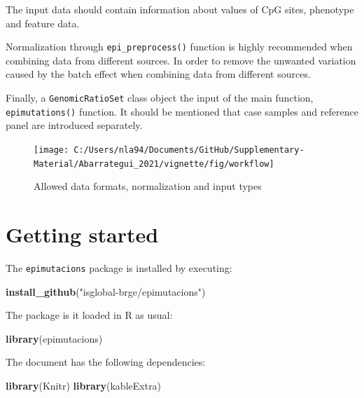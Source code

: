 \documentclass[
]{article}
\newenvironment{Shaded}{\begin{snugshade}}{\end{snugshade}}
\newcommand{\KeywordTok}[1]{\textcolor[rgb]{0.13,0.29,0.53}{\textbf{#1}}}
\newcommand{\NormalTok}[1]{#1}
\newcommand{\StringTok}[1]{\textcolor[rgb]{0.31,0.60,0.02}{#1}}
\begin{document}
The input data should contain information about \beta values of CpG
sites, phenotype and feature data.

Normalization through \texttt{epi\_preprocess()} function is highly
recommended when combining data from different sources. In order to
remove the unwanted variation caused by the batch effect when combining
data from different sources.

Finally, a \texttt{GenomicRatioSet} class object the input of the main
function, \texttt{epimutations()} function. It should be mentioned that
case samples and reference panel are introduced separately.

\begin{figure}

{\centering \texttt{[image: C:/Users/nla94/Documents/GitHub/Supplementary-Material/Abarrategui\_2021/vignette/fig/workflow]} 

}

\caption{Allowed data formats, normalization and input types}\label{fig:workflow}
\end{figure}

\hypertarget{getting-started}{%
\section{Getting started}\label{getting-started}}

The \texttt{epimutacions} package is installed by executing:

\begin{Shaded}
\begin{Highlighting}[]
\KeywordTok{install_github}\NormalTok{(}\StringTok{"isglobal-brge/epimutacions"}\NormalTok{)}
\end{Highlighting}
\end{Shaded}

The package is it loaded in R as usual:

\begin{Shaded}
\begin{Highlighting}[]
\KeywordTok{library}\NormalTok{(epimutacions)}
\end{Highlighting}
\end{Shaded}

The document has the following dependencies:

\begin{Shaded}
\begin{Highlighting}[]
\KeywordTok{library}\NormalTok{(Knitr)}
\KeywordTok{library}\NormalTok{(kableExtra)}
\end{Highlighting}
\end{Shaded}
\end{document}

